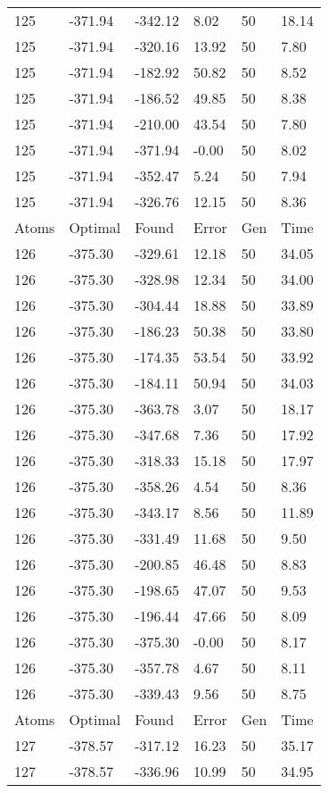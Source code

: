\documentclass{report}
\begin{document}
\begin{appendix}
\begin{longtable}{llllll}
125 & -371.94 & -342.12 & 8.02 & 50 & 18.14 \\
125 & -371.94 & -320.16 & 13.92 & 50 & 7.80 \\
125 & -371.94 & -182.92 & 50.82 & 50 & 8.52 \\
125 & -371.94 & -186.52 & 49.85 & 50 & 8.38 \\
125 & -371.94 & -210.00 & 43.54 & 50 & 7.80 \\
125 & -371.94 & -371.94 & -0.00 & 50 & 8.02 \\
125 & -371.94 & -352.47 & 5.24 & 50 & 7.94 \\
125 & -371.94 & -326.76 & 12.15 & 50 & 8.36 \\
Atoms & Optimal & Found & Error & Gen & Time \\
126 & -375.30 & -329.61 & 12.18 & 50 & 34.05 \\
126 & -375.30 & -328.98 & 12.34 & 50 & 34.00 \\
126 & -375.30 & -304.44 & 18.88 & 50 & 33.89 \\
126 & -375.30 & -186.23 & 50.38 & 50 & 33.80 \\
126 & -375.30 & -174.35 & 53.54 & 50 & 33.92 \\
126 & -375.30 & -184.11 & 50.94 & 50 & 34.03 \\
126 & -375.30 & -363.78 & 3.07 & 50 & 18.17 \\
126 & -375.30 & -347.68 & 7.36 & 50 & 17.92 \\
126 & -375.30 & -318.33 & 15.18 & 50 & 17.97 \\
126 & -375.30 & -358.26 & 4.54 & 50 & 8.36 \\
126 & -375.30 & -343.17 & 8.56 & 50 & 11.89 \\
126 & -375.30 & -331.49 & 11.68 & 50 & 9.50 \\
126 & -375.30 & -200.85 & 46.48 & 50 & 8.83 \\
126 & -375.30 & -198.65 & 47.07 & 50 & 9.53 \\
126 & -375.30 & -196.44 & 47.66 & 50 & 8.09 \\
126 & -375.30 & -375.30 & -0.00 & 50 & 8.17 \\
126 & -375.30 & -357.78 & 4.67 & 50 & 8.11 \\
126 & -375.30 & -339.43 & 9.56 & 50 & 8.75 \\
Atoms & Optimal & Found & Error & Gen & Time \\
127 & -378.57 & -317.12 & 16.23 & 50 & 35.17 \\
127 & -378.57 & -336.96 & 10.99 & 50 & 34.95 \\

\end{longtable}
\end{appendix}
\end{document}
